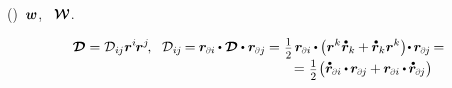\vspace{-0.1em}\noindent
{}  ()~${\bm{w}}$, ~${\vorticitytensor}$.

  

\nopagebreak\vspace{-0.4em}\begin{multline*}
\rateofdeformationtensor = \rateofdeformationcomponents{i\hspace{-0.1ex}j} \currentlocationvector^{i} \hspace{-0.2ex} \currentlocationvector^j
\hspace{-0.3ex} , \hspace{.6em}
\rateofdeformationcomponents{i\hspace{-0.1ex}j} \hspace{-0.2ex}
= \hspace{-0.1ex} \currentlocationvector_\differentialindex{i} \hspace{-0.1ex} \dotp \rateofdeformationtensor \dotp \currentlocationvector_\differentialindex{j} \hspace{-0.1ex}
= \hspace{.1ex} \smalldisplaystyleonehalf \hspace{.25ex} \currentlocationvector_\differentialindex{i} \hspace{-0.1ex} \dotp \hspace{-0.1ex} \bigl( \currentlocationvector^{k} \mathdotabove{\currentlocationvector}_{k} \hspace{-0.1ex} + \hspace{-0.1ex} \mathdotabove{\currentlocationvector}_k \currentlocationvector^{k} \bigr) \hspace{-0.4ex} \dotp \hspace{-0.15ex} \currentlocationvector_\differentialindex{\hspace{-0.1ex}j} \hspace{-0.2ex}
=
\\[-0.3em]
\shoveright{ \hfill \hspace{12em}
= \hspace{.1ex} \smalldisplaystyleonehalf \hspace{.1ex} \bigl( \mathdotabove{\currentlocationvector}_\differentialindex{i} \hspace{-0.1ex} \dotp \hspace{-0.15ex} \currentlocationvector_\differentialindex{\hspace{-0.1ex}j} \hspace{-0.1ex} + \hspace{-0.1ex} \currentlocationvector_\differentialindex{i} \hspace{-0.1ex} \dotp \hspace{-0.15ex} \mathdotabove{\currentlocationvector}_\differentialindex{\hspace{-0.1ex}j} \bigr) \hspace{-0.3ex}
}
\end{multline*}
